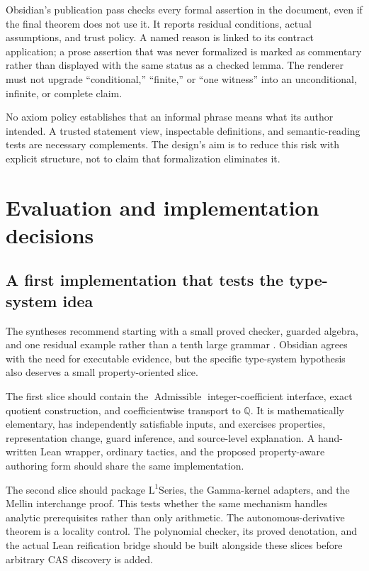 \documentclass[11pt,a4paper]{article}
\newcommand{\Q}{\mathbb Q}\newcommand{\R}{\mathbb R}
\newcommand{\Lone}{\operatorname{L^1Series}}
\theoremstyle{plain}\newtheorem{proposition}{Proposition}[section]
\theoremstyle{definition}\newtheorem{definition}[proposition]{Definition}
\theoremstyle{remark}\newtheorem{remark}[proposition]{Remark}
\begin{document}
Obsidian's publication pass checks every formal assertion in the document, even if the final theorem does not use it. It reports residual conditions, actual assumptions, and trust policy. A named reason is linked to its contract application; a prose assertion that was never formalized is marked as commentary rather than displayed with the same status as a checked lemma. The renderer must not upgrade ``conditional,'' ``finite,'' or ``one witness'' into an unconditional, infinite, or complete claim.

No axiom policy establishes that an informal phrase means what its author intended. A trusted statement view, inspectable definitions, and semantic-reading tests are necessary complements. The design's aim is to reduce this risk with explicit structure, not to claim that formalization eliminates it.

\section{Evaluation and implementation decisions}\label{sec:evaluation}
\subsection{A first implementation that tests the type-system idea}
The syntheses recommend starting with a small proved checker, guarded algebra, and one residual example rather than a tenth large grammar \cite{synA,synB}. Obsidian agrees with the need for executable evidence, but the specific type-system hypothesis also deserves a small property-oriented slice.

The first slice should contain the \(\operatorname{Admissible}\) integer-coefficient interface, exact quotient construction, and coefficientwise transport to \(\Q\). It is mathematically elementary, has independently satisfiable inputs, and exercises properties, representation change, guard inference, and source-level explanation. A hand-written Lean wrapper, ordinary tactics, and the proposed property-aware authoring form should share the same implementation.

The second slice should package \(\Lone\), the Gamma-kernel adapters, and the Mellin interchange proof. This tests whether the same mechanism handles analytic prerequisites rather than only arithmetic. The autonomous-derivative theorem is a locality control. The polynomial checker, its proved denotation, and the actual Lean reification bridge should be built alongside these slices before arbitrary CAS discovery is added.
\end{document}
